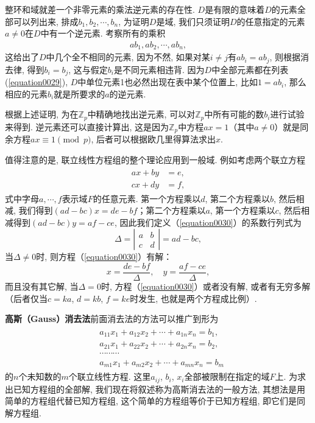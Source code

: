 整环和域就差一个非零元素的乘法逆元素的存在性. $D$是有限的意味着$D$的元素全部可以列出来, 排成$b_1,b_2,\cdots,b_n$, 为证明$D$是域, 我们只须证明$D$的任意指定的元素$a \neq 0$在$D$中有一个逆元素. 考察所有的乘积
\begin{gather}\label{equation0029}
ab_1, ab_2, \cdots, ab_n,
\end{gather}
这给出了$D$中几个全不相同的元素, 因为不然, 如果对某$i \neq j$有$ab_i = ab_j$, 则根据消去律, 得到$b_i=b_j$, 这与假定$b_i$是不同元素相违背. 因为$D$中全部元素都在列表(\ref{equation0029}), $D$中单位元素1也必然出现在表中某个位置上, 比如$1 = ab_i$, 那么相应的元素$b_i$就是所要求的$a$的逆元素. 

根据上述证明, 为在$\mathbb{Z}_p$中精确地找出逆元素, 可以对$\mathbb{Z}_p$中所有可能的数$b_i$进行试验来得到. 逆元素还可以直接计算出, 这是因为$\mathbb{Z}_p$中方程$ax=1$（其中$a \neq 0$）就是同余方程$ax \equiv 1 \pmod{p}$, 后者可以根据欧几里得算法求出$x$. 

值得注意的是, 联立线性方程组的整个理论应用到一般域. 例如考虑两个联立方程
\begin{gather} \label{equation0030}
\begin{aligned}
ax+by&=e,\\
cx+dy&=f,
\end{aligned}
\end{gather}
式中字母$a,\cdots,f$表示域$F$的任意元素. 第一个方程乘以$d$, 第二个方程乘以$b$, 然后相减, 我们得到$(ad-bc)x=de-bf$；第二个方程乘以$a$, 第一个方程乘以$c$, 然后相减得到$(ad-bc)y=af-ce$, 因此我们定义（\ref{equation0030}）的系数行列式为
\[
\Delta=\left|\begin{array}{cc}
a & b \\
c & d
\end{array}\right|=ad-bc,
\]
当$\Delta \neq 0$时, 则方程（\ref{equation0030}）有解：
\[
x = \frac{de-bf}{\Delta}, \quad y = \frac{af-ce}{\Delta},
\]
而且没有其它解, 当$\Delta=0$时, 方程（\ref{equation0030}）或者没有解, 或者有无穷多解（后者仅当$c=ka$, $d=kb$, $f=ke$时发生, 也就是两个方程成比例）. 

\textbf{高斯（Gauss）消去法}\quad 前面消去法的方法可以推广到形为
\begin{gather}\label{equation0031}
\begin{aligned}
&a_{11}x_1+a_{12}x_2+\cdots+a_{1n}x_n=b_1,\\
&a_{21}x_1+a_{22}x_2+\cdots+a_{2n}x_n=b_2,\\
&\cdots\cdots\cdots\\
&a_{m1}x_1+a_{m2}x_2+\cdots+a_{mn}x_n=b_m
\end{aligned}
\end{gather}
的$n$个未知数的$m$个联立线性方程. 这里$a_{ij}$, $b_i$, $x_i$全部被限制在指定的域$F$上. 为求出已知方程组的全部解, 我们现在将叙述称为高斯消去法的一般方法, 其想法是用简单的方程组代替已知方程组, 这个简单的方程组等价于已知方程组, 即它们是同解方程组. 


